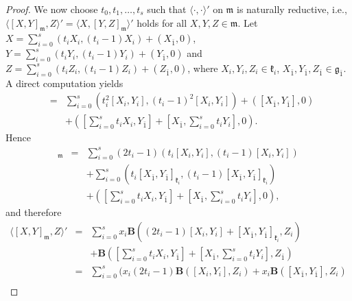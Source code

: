 \documentclass[10pt,a4paper]{amsart}
\begin{document}
\begin{proof}
We now choose $t_{0},t_{1},\ldots,t_{s}$ such that  $\langle\cdot,\cdot\rangle'$ on $\mathfrak{m}$ is naturally reductive, i.e., $\langle [X,Y]_{\mathfrak{m}},Z\rangle'=\langle X,[Y,Z]_{\mathfrak{m}}\rangle'$ holds for all $X,Y,Z\in\mathfrak{m}$. Let
$X=\sum_{i=0}^{s}(t_{i}X_{i},(t_{i}-1)X_{i})+(X_{\bar{1}},0)$,
$Y=\sum_{i=0}^{s}(t_{i}Y_{i},(t_{i}-1)Y_{i})+(Y_{\bar{1}},0)$
and $Z=\sum_{i=0}^{s}(t_{i}Z_{i},(t_{i}-1)Z_{i})+(Z_{\bar{1}},0)$,
where $X_{i},Y_{i},Z_{i}\in\mathfrak{k}_{i}$, $X_{\bar{1}},Y_{\bar{1}},Z_{\bar{1}}\in\mathfrak{g}_{\bar{1}}$.
A direct computation yields
\begin{eqnarray*}
[X,Y]&=& \sum_{i=0}^{s}\left( t_{i}^{2}[X_{i},Y_{i}],(t_{i}-1)^{2}[X_{i},Y_{i}] \right)
         +\left( [X_{\bar{1}},Y_{\bar{1}}],0\right) \\
      && +\left(
         \left[\sum_{i=0}^{s}t_{i}X_{i},Y_{\bar{1}}\right] +\left[ X_{\bar{1}},\sum_{i=0}^{s}t_{i}Y_{i}\right], 0
         \right).
\end{eqnarray*}
Hence
\begin{eqnarray*}
[X,Y]_{\mathfrak{m}}&=& \sum_{i=0}^{s}(2t_{i}-1)\left( t_{i}[X_{i},Y_{i}],(t_{i}-1)[X_{i},Y_{i}]\right)\\
                     && +\sum_{i=0}^{s} \left( t_{i}[X_{\bar{1}},Y_{\bar{1}}]_{\mathfrak{k}_{i}},(t_{i}-1)[X_{\bar{1}},Y_{\bar{1}}]_{\mathfrak{k}_{i}}\right)\\
                     && +\left(
                         \left[ \sum_{i=0}^{s}t_{i}X_{i},Y_{\bar{1}}\right] +\left[ X_{\bar{1}},\sum_{i=0}^{s}t_{i}Y_{i}\right],0
                         \right),
\end{eqnarray*}
and therefore
\begin{eqnarray*}
\langle [X,Y]_{\mathfrak{m}},Z\rangle'&=&\sum_{i=0}^{s} x_{i}\mathbf{B}\left(
                                          (2t_{i}-1)[X_{i},Y_{i}]+[X_{\bar{1}},Y_{\bar{1}}]_{\mathfrak{k}_{i}},Z_{i}
                                          \right) \\
                                      && +\mathbf{B}\left(
                                           \left[ \sum_{i=0}^{s}t_{i}X_{i},Y_{\bar{1}}\right]+\left[ X_{\bar{1}},\sum_{i=0}^{s}t_{i}Y_{i}\right] ,Z_{\bar{1}}
                                          \right)\\
                                       &=&\sum_{i=0}^{s}\Big(
                                              x_{i}(2t_{i}-1)\mathbf{B}([X_{i},Y_{i}],Z_{i})+x_{i}\mathbf{B}([X_{\bar{1}},Y_{\bar{1}}],Z_{i}) \\

\end{eqnarray*}
\end{proof}
\end{document}
